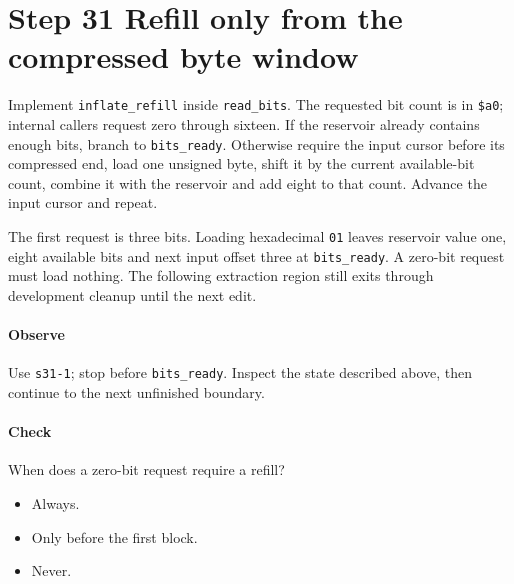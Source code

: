 \section{Step 31 Refill only from the compressed byte window}\label{png-inflate-s31}
Implement \texttt{inflate\_refill} inside \texttt{read\_bits}. The requested bit count is in \texttt{\$a0}; internal callers request zero through sixteen. If the reservoir already contains enough bits, branch to \texttt{bits\_ready}. Otherwise require the input cursor before its compressed end, load one unsigned byte, shift it by the current available-bit count, combine it with the reservoir and add eight to that count. Advance the input cursor and repeat.

The first request is three bits. Loading hexadecimal \texttt{01} leaves reservoir value one, eight available bits and next input offset three at \texttt{bits\_ready}. A zero-bit request must load nothing. The following extraction region still exits through development cleanup until the next edit.

\paragraph{Observe} Use \texttt{s31-1}; stop before \texttt{bits\_ready}. Inspect the state described above, then continue to the next unfinished boundary.

\paragraph{Check} When does a zero-bit request require a refill?
\begin{itemize}
  \item[A.] Always.
  \item[B.] Only before the first block.
  \item[C.] Never.
\end{itemize}
